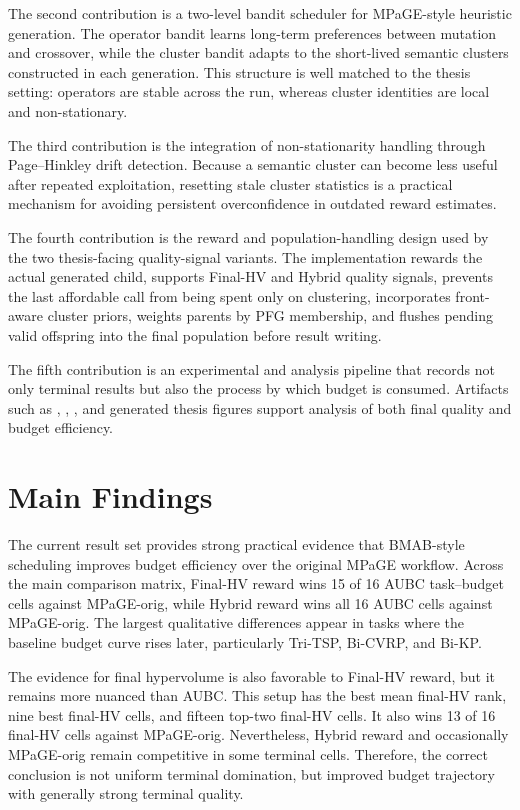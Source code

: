 The second contribution is a two-level bandit scheduler for MPaGE-style heuristic generation. The operator bandit learns long-term preferences between mutation and crossover, while the cluster bandit adapts to the short-lived semantic clusters constructed in each generation. This structure is well matched to the thesis setting: operators are stable across the run, whereas cluster identities are local and non-stationary.

The third contribution is the integration of non-stationarity handling through Page--Hinkley drift detection. Because a semantic cluster can become less useful after repeated exploitation, resetting stale cluster statistics is a practical mechanism for avoiding persistent overconfidence in outdated reward estimates.

The fourth contribution is the reward and population-handling design used by the two thesis-facing quality-signal variants. The implementation rewards the actual generated child, supports Final-HV and Hybrid quality signals, prevents the last affordable call from being spent only on clustering, incorporates front-aware cluster priors, weights parents by PFG membership, and flushes pending valid offspring into the final population before result writing.

The fifth contribution is an experimental and analysis pipeline that records not only terminal results but also the process by which budget is consumed. Artifacts such as , , , and generated thesis figures support analysis of both final quality and budget efficiency.

\section{Main Findings}

The current result set provides strong practical evidence that BMAB-style scheduling improves budget efficiency over the original MPaGE workflow. Across the main comparison matrix, Final-HV reward wins 15 of 16 AUBC task--budget cells against MPaGE-orig, while Hybrid reward wins all 16 AUBC cells against MPaGE-orig. The largest qualitative differences appear in tasks where the baseline budget curve rises later, particularly Tri-TSP, Bi-CVRP, and Bi-KP.

The evidence for final hypervolume is also favorable to Final-HV reward, but it remains more nuanced than AUBC. This setup has the best mean final-HV rank, nine best final-HV cells, and fifteen top-two final-HV cells. It also wins 13 of 16 final-HV cells against MPaGE-orig. Nevertheless, Hybrid reward and occasionally MPaGE-orig remain competitive in some terminal cells. Therefore, the correct conclusion is not uniform terminal domination, but improved budget trajectory with generally strong terminal quality.

